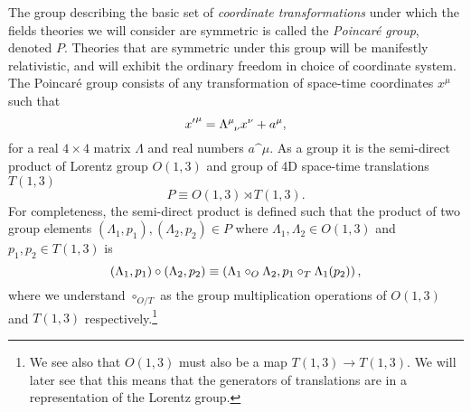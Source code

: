\documentclass[../main.tex]{subfiles}
\begin{document}
The group describing the basic set of \emph{coordinate transformations} under which the fields theories we will consider are symmetric is called the \emph{Poincaré group}, denoted \(P\).
Theories that are symmetric under this group will be manifestly relativistic, and will exhibit the ordinary freedom in choice of coordinate system.
The Poincaré group consists of any transformation of space-time coordinates \(x^\mu\) such that
\begin{equation}
  {x^\prime}\^\mu = \Lambda\indices{^\mu_\nu} x\^\nu + a\^\mu,
\end{equation}
for a real \(4\times 4\) matrix \(\Lambda\) and real numbers \(a\^\mu\).
As a group it is the semi-direct product of Lorentz group \(O(1,3)\) and group of 4D space-time translations \(T(1,3)\)
\begin{equation}
  P \equiv O(1,3) \rtimes T(1,3).
\end{equation}
For completeness, the semi-direct product is defined such that the product of two group elements \((\Lambda_1, p_1), (\Lambda_2, p_2) \in P\) where \(\Lambda_1, \Lambda_2 \in O(1,3)\) and \(p_1, p_2 \in T(1,3)\) is
\begin{equation}
  (\Lambda_1, p_1) \circ (\Lambda_2, p_2) \equiv \left(\Lambda_1 \circ_O \Lambda_2, p_1 \circ_T \Lambda_1(p_2)\right),
\end{equation}
where we understand \(\circ_{O/T}\) as the group multiplication operations of \(O(1,3)\) and \(T(1,3)\) respectively.\footnote{We see also that \(O(1,3)\) must also be a map \(T(1,3) \to T(1,3)\).
  We will later see that this means that the generators of translations are in a representation of the Lorentz group.}
\end{document}
